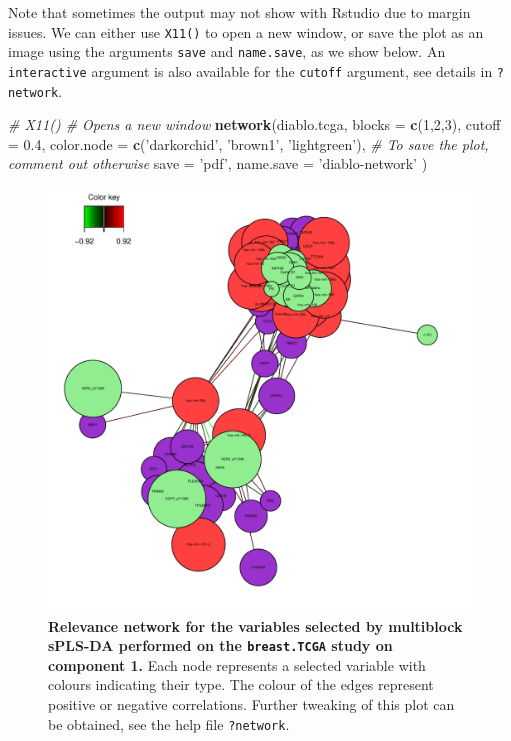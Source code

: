 \documentclass[]{book}
\newenvironment{Shaded}{\begin{snugshade}}{\end{snugshade}}
\newcommand{\KeywordTok}[1]{\textcolor[rgb]{0.13,0.29,0.53}{\textbf{#1}}}
\newcommand{\DataTypeTok}[1]{\textcolor[rgb]{0.13,0.29,0.53}{#1}}
\newcommand{\DecValTok}[1]{\textcolor[rgb]{0.00,0.00,0.81}{#1}}
\newcommand{\FloatTok}[1]{\textcolor[rgb]{0.00,0.00,0.81}{#1}}
\newcommand{\StringTok}[1]{\textcolor[rgb]{0.31,0.60,0.02}{#1}}
\newcommand{\CommentTok}[1]{\textcolor[rgb]{0.56,0.35,0.01}{\textit{#1}}}
\newcommand{\NormalTok}[1]{#1}
\begin{document}
Note that sometimes the output may not show with Rstudio due to margin
issues. We can either use \texttt{X11()} to open a new window, or save
the plot as an image using the arguments \texttt{save} and
\texttt{name.save}, as we show below. An \texttt{interactive} argument
is also available for the \texttt{cutoff} argument, see details in
\texttt{?network}.

\begin{Shaded}
\begin{Highlighting}[]
\CommentTok{# X11()   # Opens a new window}
\KeywordTok{network}\NormalTok{(diablo.tcga, }\DataTypeTok{blocks =} \KeywordTok{c}\NormalTok{(}\DecValTok{1}\NormalTok{,}\DecValTok{2}\NormalTok{,}\DecValTok{3}\NormalTok{), }
        \DataTypeTok{cutoff =} \FloatTok{0.4}\NormalTok{,}
        \DataTypeTok{color.node =} \KeywordTok{c}\NormalTok{(}\StringTok{'darkorchid'}\NormalTok{, }\StringTok{'brown1'}\NormalTok{, }\StringTok{'lightgreen'}\NormalTok{),}
        \CommentTok{# To save the plot, comment out otherwise}
        \DataTypeTok{save =} \StringTok{'pdf'}\NormalTok{, }\DataTypeTok{name.save =} \StringTok{'diablo-network'}
\NormalTok{        )}
\end{Highlighting}
\end{Shaded}

\begin{figure}

{\centering \includegraphics[width=0.5\linewidth]{Figures/DIABLO/diablo-network} 

}

\caption{\textbf{Relevance network for the variables
selected by multiblock sPLS-DA performed on the \texttt{breast.TCGA}
study on component 1.} Each node represents a selected variable with
colours indicating their type. The colour of the edges represent
positive or negative correlations. Further tweaking of this plot can be
obtained, see the help file \texttt{?network}.}\label{fig:diablo-network}
\end{figure}
\end{document}
